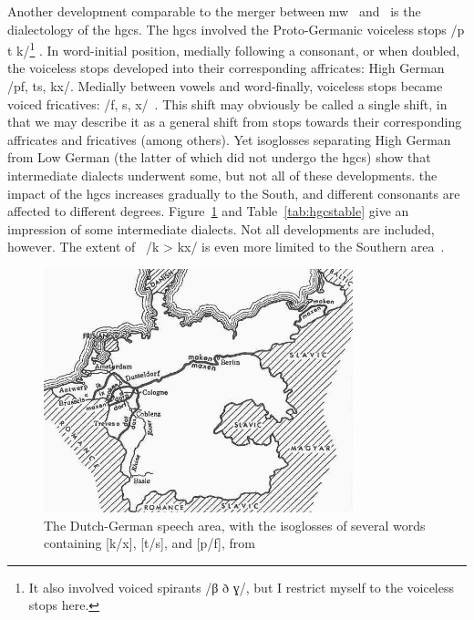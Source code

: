 Another development comparable to the merger between \gls{mw} \lT\ and \xD\  is the dialectology of the \gls{hgcs}. The \gls{hgcs} involved the Proto-Germanic voiceless stops /p t k/\footnote{It also involved  voiced spirants /β ð ɣ/, but I restrict myself to the voiceless stops here.} . In word-initial position, medially following a consonant, or when doubled, the voiceless stops developed into their corresponding affricates: High German /pf, ts, kx/. Medially between vowels and word-finally, voiceless stops became voiced fricatives: /f, s, x/~\autocite[56--57]{Wat_History76}.  This shift may obviously be called a single shift, in that we may describe it as a general shift from stops towards their corresponding affricates and fricatives (among others). Yet isoglosses separating High German from Low German (the latter of which did not undergo the \gls{hgcs}) show that intermediate dialects underwent some, but not all of these developments. the impact of the \gls{hgcs} increases gradually to the South, and different consonants are affected to different degrees. Figure~\ref{fig:hgcsmap} and Table~\ref{tab:hgcstable} give an impression of some intermediate dialects. Not all developments are included, however. The extent of \eg~/k > kx/ is even more limited to the Southern area~\autocite[56n]{Wat_History76}.

\begin{figure}[h]
  \centering
  \includegraphics[width=0.8\textwidth]{3orth/images/hgcs.jpg}
  \caption[Bloomfield's isoglosses of the \gls{hgcs}.]{The Dutch-German speech area, with the isoglosses of several words containing [k/x], [t/s], and [p/f], from \textcite[344]{Blo_Language33}}
\label{fig:hgcsmap}
\end{figure}

